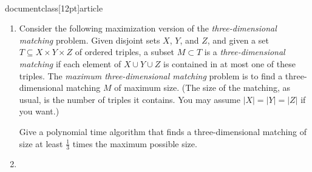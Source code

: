 \\documentclass[12pt]{article}
\begin{document}
\begin{enumerate}
{\begin{proof}
Therefore the optimal solution is not worse that this particular one.
That is,
$$w_{LP} \le  \sum_{i=1}^n w_i x_i =  \sum_{a_i\in S} w_i = w(S^*)$$
\end{proof}

Therefore we have a hitting set $S$, such that $w(S) \le b\cdot w(S^*)$.

}


\item 

Consider the following maximization version of the
{\em three-dimensional matching} problem. Given disjoint sets $X$, $Y$, and
$Z$, and given a set $T \subseteq X \times Y \times Z$
of ordered triples, a subset $M \subset T$ is a {\em three-dimensional
matching} if each element of $X \cup Y \cup Z$ is contained in
at most one of these triples. The {\em maximum three-dimensional matching}
problem is to find a three-dimensional matching $M$ of maximum size.
(The size of the matching, as usual, is the number of triples
it contains.  You may assume $|X| = |Y| = |Z|$ if you want.)

Give a polynomial time algorithm that finds a three-dimensional matching
of size at least $\frac{1}{3}$ times the maximum possible size.



\item 


\end{enumerate}
\end{document}
